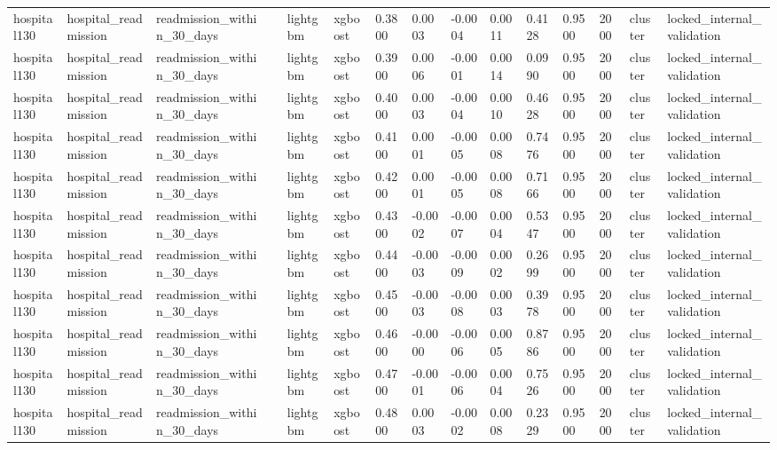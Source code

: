 \begin{tabular}{lllllllllllllll}
hospital130 & hospital\_readmission & readmission\_within\_30\_days &  & lightgbm & xgboost & 0.3800 & 0.0003 & -0.0004 & 0.0011 & 0.4128 & 0.9500 & 2000 & cluster & locked\_internal\_validation \\
hospital130 & hospital\_readmission & readmission\_within\_30\_days &  & lightgbm & xgboost & 0.3900 & 0.0006 & -0.0001 & 0.0014 & 0.0990 & 0.9500 & 2000 & cluster & locked\_internal\_validation \\
hospital130 & hospital\_readmission & readmission\_within\_30\_days &  & lightgbm & xgboost & 0.4000 & 0.0003 & -0.0004 & 0.0010 & 0.4628 & 0.9500 & 2000 & cluster & locked\_internal\_validation \\
hospital130 & hospital\_readmission & readmission\_within\_30\_days &  & lightgbm & xgboost & 0.4100 & 0.0001 & -0.0005 & 0.0008 & 0.7476 & 0.9500 & 2000 & cluster & locked\_internal\_validation \\
hospital130 & hospital\_readmission & readmission\_within\_30\_days &  & lightgbm & xgboost & 0.4200 & 0.0001 & -0.0005 & 0.0008 & 0.7166 & 0.9500 & 2000 & cluster & locked\_internal\_validation \\
hospital130 & hospital\_readmission & readmission\_within\_30\_days &  & lightgbm & xgboost & 0.4300 & -0.0002 & -0.0007 & 0.0004 & 0.5347 & 0.9500 & 2000 & cluster & locked\_internal\_validation \\
hospital130 & hospital\_readmission & readmission\_within\_30\_days &  & lightgbm & xgboost & 0.4400 & -0.0003 & -0.0009 & 0.0002 & 0.2699 & 0.9500 & 2000 & cluster & locked\_internal\_validation \\
hospital130 & hospital\_readmission & readmission\_within\_30\_days &  & lightgbm & xgboost & 0.4500 & -0.0003 & -0.0008 & 0.0003 & 0.3978 & 0.9500 & 2000 & cluster & locked\_internal\_validation \\
hospital130 & hospital\_readmission & readmission\_within\_30\_days &  & lightgbm & xgboost & 0.4600 & -0.0000 & -0.0006 & 0.0005 & 0.8786 & 0.9500 & 2000 & cluster & locked\_internal\_validation \\
hospital130 & hospital\_readmission & readmission\_within\_30\_days &  & lightgbm & xgboost & 0.4700 & -0.0001 & -0.0006 & 0.0004 & 0.7526 & 0.9500 & 2000 & cluster & locked\_internal\_validation \\
hospital130 & hospital\_readmission & readmission\_within\_30\_days &  & lightgbm & xgboost & 0.4800 & 0.0003 & -0.0002 & 0.0008 & 0.2329 & 0.9500 & 2000 & cluster & locked\_internal\_validation \\

\end{tabular}
